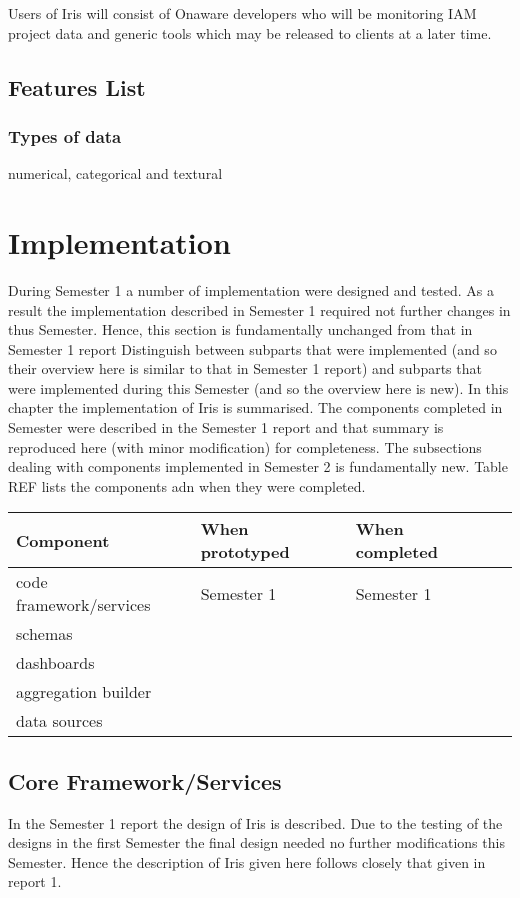 \documentclass[12pt,a4paper,titlepage]{report}
\begin{document}
Users of Iris will consist of Onaware developers who will be monitoring IAM project data and generic tools which may be released to clients at a later time.

\section{Features List}
\subsection{Types of data}
numerical, categorical and textural

\chapter{Implementation}
During Semester 1 a number of implementation were designed and tested. As a result the implementation described in
Semester 1 required not further changes in thus Semester. Hence, this section is fundamentally unchanged from that in
Semester 1 report
Distinguish between subparts that were implemented (and so their overview here is similar to that in Semester 1 report) and
subparts that were implemented during this Semester (and so the overview here is new).
In this chapter the implementation of Iris is summarised. The components completed in Semester were described in the
Semester 1 report and that summary is reproduced here (with minor modification) for completeness. The subsections dealing
with components implemented in Semester 2 is fundamentally new. Table REF lists the components adn when they were completed.
\begin{center}
\begin{tabular}{llll}
Component                         & When prototyped  & When completed \\\hline
code framework/services  & Semester 1 & Semester 1 \\
schemas &\\
dashboards &\\
aggregation builder  &\\
data sources & \\
\end{tabular}
\end{center}

\section{Core Framework/Services}
In the Semester 1 report the design of Iris is described. Due to the testing of the designs in the first Semester the final design needed no further modifications this Semester. Hence the description of Iris given here follows closely that given in report 1.
\end{document}
